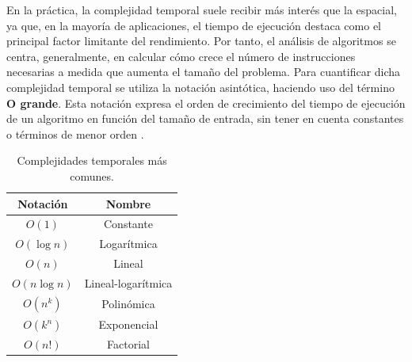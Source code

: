 En la práctica, la complejidad temporal suele recibir más interés que la espacial, ya que, en la mayoría de aplicaciones, el 
tiempo de ejecución destaca como el principal factor limitante del rendimiento. Por tanto, el análisis de algoritmos se centra,
generalmente, en calcular cómo crece el número de instrucciones necesarias a medida que aumenta el tamaño del problema. Para 
cuantificar dicha complejidad temporal se utiliza la notación asintótica, haciendo uso del término \textbf{O grande}. Esta
notación expresa el orden de crecimiento del tiempo de ejecución de un algoritmo en función del tamaño de entrada, sin tener en 
cuenta constantes o términos de menor orden \cite{phalke2022}.

\begin{table}[ht]
    \renewcommand{\arraystretch}{1.3}
    \caption{Complejidades temporales más comunes.}
    \label{tab:complejidades}
    \begin{center}
        \begin{tabular}{|c|c|}
            \hline
            \textbf{Notación} & \textbf{Nombre} \\
            \hline
            $O(1)$ & Constante \\
            \hline
            $O(\log n)$ & Logarítmica \\
            \hline
            $O(n)$ & Lineal \\
            \hline
            $O(n \log n)$ & Lineal-logarítmica \\
            \hline
            $O(n^k)$ & Polinómica \\
            \hline
            $O(k^n)$ & Exponencial \\
            \hline
            $O(n!)$ & Factorial \\
            \hline
        \end{tabular}
    \end{center}
\end{table}

